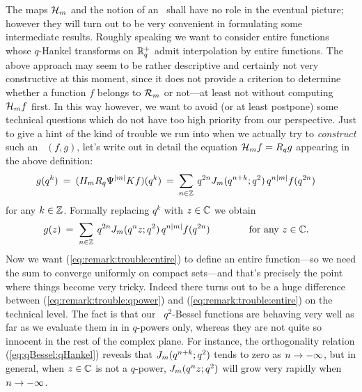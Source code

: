 \begin{remark} \label{rem:not_constructive} \rm
The maps ${\mathcal H}_{m}$ and the notion of an \Hmpair\ shall have no
role in the eventual picture; however they will turn out to be
very convenient in formulating some intermediate results. Roughly
speaking we want to consider entire functions whose $q$-Hankel
transforms on $\mathbb{R}_q^+$ admit interpolation by entire functions.
The above approach may seem to be rather descriptive and certainly
not very constructive at this moment, since it does not provide a
criterion to determine whether a function $f$ belongs to
${\mathcal R}_{m}$ or not---at least not without computing ${\mathcal H}_{m} f$
first. In this way however, we want to avoid (or at least
postpone) some technical questions which do not have too high
priority from our perspective. Just to give a hint of the kind of
trouble we run into when we actually try to {\em construct\/}
such an \Hmpair\ $(f,g)$, let's write out in detail the equation
${\mathcal H}_{m} f = R_q g$ appearing in the above definition:
\begin{equation}\label{eq:remark:trouble:qpower}
 g(q^k) \:=\: (H_m R_q \Psi^{|m|} K f)(q^k)
        \:=\:  \sum_{n\in \mathbb{Z}} \: q^{2n} J_{m}(q^{n+k}; q^2)\, q^{n|m|} f(q^{2n})
        \hspace{1em}
\end{equation}
for any $k\in\mathbb{Z}$. Formally replacing $q^k$ with $z\in\mathbb{C}$ we obtain
\begin{equation}\label{eq:remark:trouble:entire}
   g(z)  \:=\;  \sum_{n\in \mathbb{Z}} \: q^{2n} J_{m}(q^n z; q^2)\, q^{n|m|} f(q^{2n})
     \hspace{4em} \mbox{for any $z\in\mathbb{C}$}. \hspace{1em}
\end{equation}
Now we want (\ref{eq:remark:trouble:entire}) to define an entire
function---so we need the sum to converge uniformly on
compact sets---and that's precisely the point where things become very tricky.
Indeed there turns out to be a huge difference between
(\ref{eq:remark:trouble:qpower}) and (\ref{eq:remark:trouble:entire})
on the technical level. The fact is that our \little\ $q^2$-Bessel
functions are behaving very well as far as we evaluate them in in $q$-powers only,
whereas they are not quite so innocent in the rest of the complex plane.
For instance, the orthogonality relation (\ref{eq:qBessel:qHankel})
reveals that $J_{m}(q^{n+k}; q^2)$ tends to zero as $n \rightarrow -\infty$, but in general,
when $z\in \mathbb{C}$ is not a $q$-power, $J_{m}(q^n z; q^2)$ will grow very
rapidly when $n \rightarrow -\infty$.


\end{remark}

